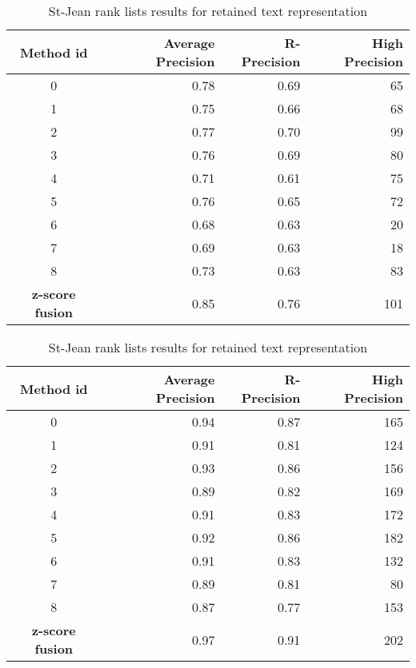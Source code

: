 \begin{table}[H]
  \centering
  \caption{St-Jean rank lists results for retained text representation}
  \label{tab:9rl_results_st_jean}

  \begin{tabular}{c r r r}
    \toprule
    Method id &
    Average Precision &
    R-Precision &
    High Precision \\
    \midrule
    0 & 0.78 & 0.69 & 65 \\
    1 & 0.75 & 0.66 & 68 \\
    2 & 0.77 & 0.70 & 99 \\
    3 & 0.76 & 0.69 & 80 \\
    4 & 0.71 & 0.61 & 75 \\
    5 & 0.76 & 0.65 & 72 \\
    6 & 0.68 & 0.63 & 20 \\
    7 & 0.69 & 0.63 & 18 \\
    8 & 0.73 & 0.63 & 83 \\
    \textbf{z-score fusion} & 0.85 & 0.76 & 101 \\
    \bottomrule
  \end{tabular}

  \label{tab:9rl_results_st_jean_B}
  \begin{tabular}{c r r r}
    \toprule
    Method id &
    Average Precision &
    R-Precision &
    High Precision \\
    \midrule
    0 & 0.94 & 0.87 & 165 \\
    1 & 0.91 & 0.81 & 124 \\
    2 & 0.93 & 0.86 & 156 \\
    3 & 0.89 & 0.82 & 169 \\
    4 & 0.91 & 0.83 & 172 \\
    5 & 0.92 & 0.86 & 182 \\
    6 & 0.91 & 0.83 & 132 \\
    7 & 0.89 & 0.81 & 80 \\
    8 & 0.87 & 0.77 & 153 \\
    \textbf{z-score fusion} & 0.97 & 0.91 & 202 \\
    \bottomrule
  \end{tabular}


\end{table}
